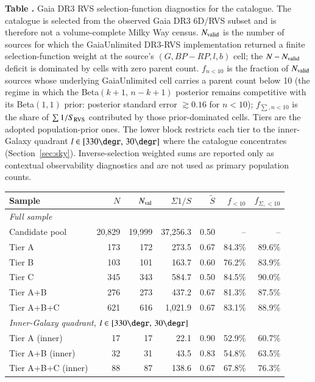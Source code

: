 \begin{center}
\label{tab:selection_function}
\begin{minipage}{\columnwidth}
\small\textbf{Table \thetable.} Gaia DR3 RVS selection-function
diagnostics for the catalogue.  The catalogue is selected from the
observed Gaia DR3 6D/RVS subset and is therefore not a volume-complete
Milky Way census.  $N_{\rm valid}$ is the number of sources for which
the GaiaUnlimited DR3-RVS implementation
\citep{CastroGinard2023} returned a finite selection-function weight at the source's $(G, BP{-}RP, l, b)$ cell;
the $N-N_{\rm valid}$ deficit is dominated by cells with zero parent
count.  $f_{n<10}$ is the fraction of $N_{\rm valid}$ sources whose
underlying GaiaUnlimited cell carries a parent count below 10 (the
regime in which the Beta$(k{+}1,\,n{-}k{+}1)$ posterior remains
competitive with its Beta$(1,1)$ prior: posterior standard error
$\gtrsim 0.16$ for $n<10$); $f_{\sum,n<10}$ is the share of
$\sum 1/S_{\rm RVS}$ contributed by those prior-dominated cells.  Tiers
are the adopted population-prior ones.  The
lower block restricts each tier to the inner-Galaxy quadrant
$l \in [330\degr,\,30\degr]$ where the catalogue concentrates
(Section~\ref{sec:sky}).  Inverse-selection weighted sums are reported
only as contextual observability diagnostics and are not used as
primary population counts.
\end{minipage}
\vspace{0.4ex}

\footnotesize
\setlength{\tabcolsep}{1pt}
\begin{tabular}{@{}lrrrrrr@{}}
\hline\hline
Sample & $N$ & $N_{\rm val}$ & $\Sigma 1/S$ & $\tilde S$ & $f_{<10}$ & $f_{\Sigma,<10}$ \\
\hline
\multicolumn{7}{l}{\textit{Full sample}} \\
Candidate pool          & 20{{,}}829 & 19{{,}}999 & 37{,}256.3 & 0.50 & --      & --      \\
Tier A                  & 173      & 172      & 273.5 & 0.67 & 84.3\%  & 89.6\%  \\
Tier B                  & 103      & 101      & 163.7 & 0.60 & 76.2\%  & 83.9\%  \\
Tier C                  & 345      & 343      & 584.7 & 0.50 & 84.5\%  & 90.0\%  \\
Tier A+B                & 276      & 273      & 437.2 & 0.67 & 81.3\%  & 87.5\%  \\
Tier A+B+C              & 621      & 616      & 1{,}021.9 & 0.67 & 83.1\%  & 88.9\%  \\
\hline
\multicolumn{7}{l}{\textit{Inner-Galaxy quadrant, $l\in[330\degr,\,30\degr]$}} \\
Tier A (inner)          & 17       & 17       & 22.1 & 0.90 & 52.9\% & 60.7\% \\
Tier A+B (inner)        & 32       & 31       & 43.5 & 0.83 & 54.8\% & 63.5\% \\
Tier A+B+C (inner)      & 88       & 87       & 138.6 & 0.67 & 67.8\% & 76.3\% \\
\hline
\end{tabular}
\end{center}
